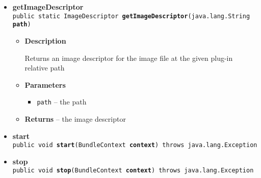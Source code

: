 {{{\begin{itemize}
{\begin{itemize}
{Returns the shared instance
}
\item{{\bf  Returns} -- 
the shared instance 
}%
\end{itemize}
}%
\item{ 
\hypertarget{it.unisa.sesa.repominer.Activator.getImageDescriptor(java.lang.String)}{{\bf  getImageDescriptor}\\}
\texttt{public static ImageDescriptor\ {\bf  getImageDescriptor}(\texttt{java.lang.String} {\bf  path})
\label{it.unisa.sesa.repominer.Activator.getImageDescriptor(java.lang.String)}}%
\begin{itemize}
\item{
{\bf  Description}

Returns an image descriptor for the image file at the given plug-in relative path
}
\item{
{\bf  Parameters}
  \begin{itemize}
   \item{
\texttt{path} -- the path}
  \end{itemize}
}%
\item{{\bf  Returns} -- 
the image descriptor 
}%
\end{itemize}
}%
\item{ 
\hypertarget{it.unisa.sesa.repominer.Activator.start(BundleContext)}{{\bf  start}\\}
\texttt{public void\ {\bf  start}(\texttt{BundleContext} {\bf  context}) throws java.lang.Exception
\label{it.unisa.sesa.repominer.Activator.start(BundleContext)}}%
}%
\item{ 
\hypertarget{it.unisa.sesa.repominer.Activator.stop(BundleContext)}{{\bf  stop}\\}
\texttt{public void\ {\bf  stop}(\texttt{BundleContext} {\bf  context}) throws java.lang.Exception
\label{it.unisa.sesa.repominer.Activator.stop(BundleContext)}}%
}%
\end{itemize}
}
}
}
